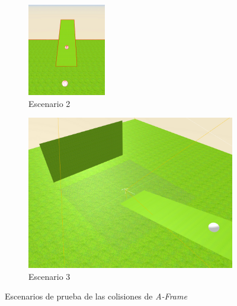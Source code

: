 \begin{figure}[!h]
\begin{subfigure}[b]{0.3\textwidth}
    \includegraphics[width=\textwidth, height=\textwidth]{colision2.png}
    \caption{Escenario 2}
  \end{subfigure}
    \hfill
  \begin{subfigure}[b]{0.3\textwidth}
    \includegraphics[width=\textwidth, height=\textwidth]{colision3.png}
    \caption{Escenario 3}
  \end{subfigure}
  \caption{Escenarios de prueba de las colisiones de \textit{A-Frame}}
 \end{figure}

